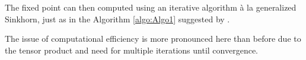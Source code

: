 \documentclass[../report.tex]{subfiles}
\begin{document}
The fixed point can then computed using an iterative algorithm à la generalized Sinkhorn, just as in the Algorithm \autoref{algo:Algo1} suggested by \cite{benamou2018entropy}.

The issue of computational efficiency is more pronounced here than before due to the tensor product and need for multiple iterations until convergence.
\end{document}

